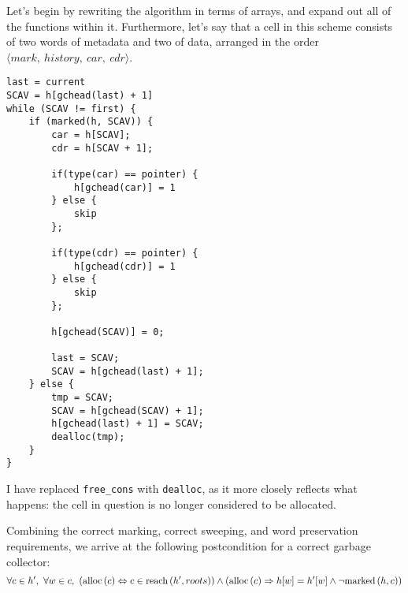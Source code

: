 Let's begin by rewriting the algorithm in terms of arrays, and expand
out all of the functions within it. Furthermore, let's say that a cell
in this scheme consists of two words of metadata and two of data,
arranged in the order $\langle mark,\ history,\ car,\ cdr \rangle$.

\begin{lstlisting}
last = current
SCAV = h[gchead(last) + 1]
while (SCAV != first) {
    if (marked(h, SCAV)) {
        car = h[SCAV];
        cdr = h[SCAV + 1];

        if(type(car) == pointer) {
            h[gchead(car)] = 1
        } else {
            skip
        };

        if(type(cdr) == pointer) {
            h[gchead(cdr)] = 1
        } else {
            skip
        };

        h[gchead(SCAV)] = 0;

        last = SCAV;
        SCAV = h[gchead(last) + 1];
    } else {
        tmp = SCAV;
        SCAV = h[gchead(SCAV) + 1];
        h[gchead(last) + 1] = SCAV;
        dealloc(tmp);
    }
}
\end{lstlisting}

I have replaced \texttt{free\_cons} with \texttt{dealloc}, as it more
closely reflects what happens: the \gls{cell} in question is no longer
considered to be allocated.

Combining the correct marking, correct sweeping, and word preservation
requirements, we arrive at the following postcondition for a correct
\gls{garbage collector}: \[\forall c \in h',\ \forall w \in c,\
(\mathrm{alloc}\left(c\right) \Leftrightarrow c \in \mathrm{reach}\left(h', roots\right)) \land (\mathrm{alloc}\left(c\right) \Rightarrow
h[w] = h'[w] \land \lnot\mathrm{marked}\left(h, c\right))\]

